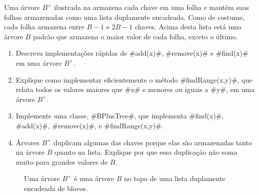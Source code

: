 \begin{exc}
  Uma árvore $B^+$ ilustrada na  armazena cada chave em uma folha e mantém suas folhas armazenadas como uma lista duplamente encadeada. Como de costume, cada folha armazena entre  $B-1$ e $2B-1$ chaves. Acima desta lista está uma árvore $B$ padrão que armazena o maior valor de cada folha, exceto o último.
  \begin{enumerate}
    \item Descreva implementações rápidas de #add(x)#, #remove(x)# e #find(x)# em uma árvore $B^+$.
    \item Explique como implementar eficientemente o método #findRange(x,y)#, que relata todos os valores maiores que #x# e menores ou iguais a #y#, em uma árvore $B^+$.
    \item Implemente uma classe, #BPlusTree#, que implementa #find(x)#,
      #add(x)#, #remove(x)#, e #findRange(x,y)#.
    \item Árvores $B^+$ duplicam algumas das chaves porque elas são armazenadas tanto na árvore $B$ quanto na lista. Explique por que essa duplicação não soma muito para grandes valores de $B$.
  \end{enumerate}
\end{exc}

\begin{figure}
  \caption{Uma árvore $B^+$ é uma árvore $B$ no topo de uma lista duplamente encadeada de blocos.}
\end{figure}


